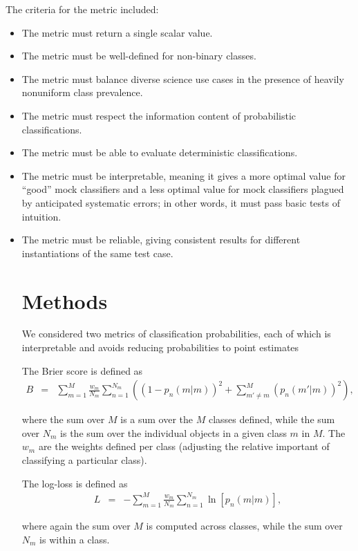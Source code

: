 \documentclass[\docopts]{\docclass}
\begin{document}
The criteria for the metric included:
\begin{itemize}
\item The metric must return a single scalar value.
\item The metric must be well-defined for non-binary classes.
\item The metric must balance diverse science use cases in the presence of heavily nonuniform class prevalence.
\item The metric must respect the information content of probabilistic classifications.
\item The metric must be able to evaluate deterministic classifications.
\item The metric must be interpretable, meaning it gives a more optimal value for ``good'' mock classifiers and a less optimal value for mock classifiers plagued by anticipated systematic errors; in other words, it must pass basic tests of intuition.
\item The metric must be reliable, giving consistent results for different instantiations of the same test case.

\section{Methods}
\label{sec:methods}
We considered two metrics of classification probabilities, each of which is interpretable and avoids reducing probabilities to point estimates

The Brier score is defined as
\begin{eqnarray*}
B &=& \sum_{m=1}^{M}\frac{w_{m}}{N_{m}}\sum_{n=1}^{N_{m}}\left((1-p_{n}(m | m))^{2}+\sum_{m'\neq m}^{M}(p_{n}(m' | m))^{2}\right),
\end{eqnarray*}

where the sum over $M$ is a sum over the $M$ classes defined, while the sum over $N_m$ is the sum over the individual objects in a given class $m$ in $M$. The $w_m$ are the weights defined per class (adjusting the relative important of classifying a particular class).


The log-loss is defined as
\begin{eqnarray*}
L &=& -\sum_{m=1}^{M}\frac{w_{m}}{N_{m}}\sum_{n=1}^{N_{m}}\ln[p_{n}(m | m)],
\end{eqnarray*}

where again the sum over $M$ is computed across classes, while the sum over $N_m$ is within a class.


\end{itemize}
\end{document}
